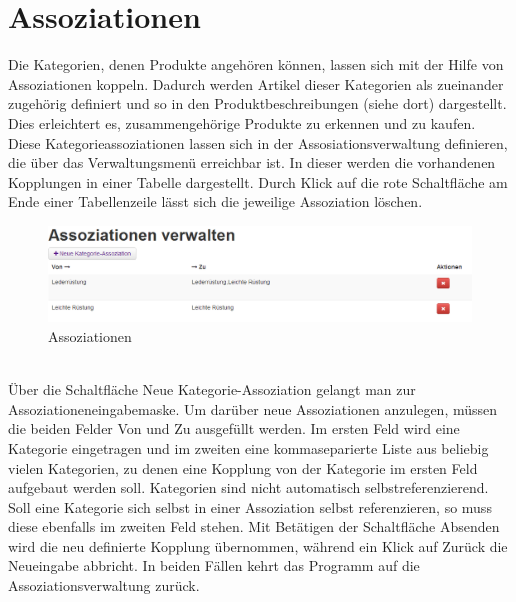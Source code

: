 \section{Assoziationen}
Die Kategorien, denen Produkte angehören können, lassen sich mit der Hilfe von Assoziationen koppeln. Dadurch werden Artikel dieser Kategorien als zueinander zu\-ge\-hö\-rig definiert und so in den Produktbeschreibungen (siehe dort) dargestellt. Dies erleichtert es, zusammengehörige Produkte zu erkennen und zu kaufen. Diese Kategorieassoziationen lassen sich in der Assosiationsverwaltung definieren, die über das Verwaltungsmenü erreichbar ist. In dieser werden die vorhandenen Kopplungen in einer Tabelle dargestellt. Durch Klick auf die rote Schaltfläche am Ende einer Tabellenzeile lässt sich die jeweilige Assoziation löschen. \\

\begin{figure}[h!]
  \centering
  \includegraphics[width=\textwidth]{UserManual/Assoziationen.png}
  \caption{Assoziationen}
  \label{fig:Assoziationen}
\end{figure}
\text{}\vspace*{-1em}\\
Über die Schaltfläche Neue Kategorie-Assoziation gelangt man zur Asso\-zia\-tionen\-ein\-ga\-be\-mas\-ke. Um darüber neue Assoziationen anzulegen, müssen die beiden Felder Von und Zu ausgefüllt werden.  Im ersten Feld wird eine Kategorie eingetragen und im zweiten eine kommaseparierte Liste aus beliebig vielen Kategorien, zu denen eine Kopplung von der Kategorie im ersten Feld aufgebaut werden soll. Kategorien sind nicht automatisch selbstreferenzierend. Soll eine Kategorie sich selbst in einer Assoziation selbst referenzieren, so muss diese ebenfalls im zweiten Feld stehen. Mit Betätigen der Schaltfläche Absenden wird die neu definierte Kopplung übernommen, während ein Klick auf Zurück die Neueingabe abbricht. In beiden Fällen kehrt das Programm auf die Assoziationsverwaltung zurück.



